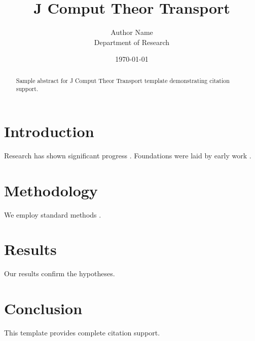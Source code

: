 \documentclass{annals}
\title{J Comput Theor Transport}
\author{Author Name \\ \small Department of Research}
\date{\today}
\begin{document}
\maketitle

\begin{abstract}
Sample abstract for J Comput Theor Transport template demonstrating citation support.
\end{abstract}

\section{Introduction}
Research has shown significant progress \citep{einstein1905}. Foundations were laid by early work \citep{turing1950}.

\section{Methodology}
We employ standard methods \citep{knuth1984}.

\section{Results}
Our results confirm the hypotheses.

\section{Conclusion}
This template provides complete citation support.



\end{document}
